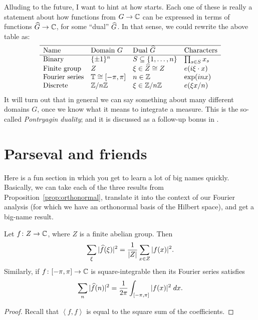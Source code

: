 Alluding to the future, I want to hint at how  starts.
Each one of these is really a statement
about how functions from $G \to \mathbb C$
can be expressed in terms of functions $\widehat G \to \mathbb C$,
for some ``dual'' $\widehat G$.
In that sense, we could rewrite the above table as:
\[
	\begin{array}{llll}
		\hline
		\text{Name} & \text{Domain }G & \text{Dual }\widehat G
			& \text{Characters} \\ \hline
		\text{Binary} & \{\pm1\}^n
			& S \subseteq \left\{ 1, \dots, n \right\}
			& \prod_{s \in S} x_s \\
		\text{Finite group} & Z
			& \xi \in \widehat Z \cong Z & e( i \xi \cdot x) \\
		\text{Fourier series} & \mathbb T \cong [-\pi, \pi]  & n \in \mathbb Z
			& \exp(inx) \\
		\text{Discrete} & \mathbb Z/n\mathbb Z & \xi \in \mathbb Z/n\mathbb Z
			& e(\xi x / n) \\
	\end{array}
\]
It will turn out that in general
we can say something about many different domains $G$,
once we know what it means to integrate a measure.
This is the so-called \emph{Pontryagin duality};
and it is discussed as a follow-up bonus in .

\section{Parseval and friends}
Here is a fun section in which you get to learn a lot of big names quickly.
Basically, we can take each of the three results
from Proposition~\ref{prop:orthonormal},
translate it into the context of our Fourier analysis
(for which we have an orthonormal basis of the Hilbert space),
and get a big-name result.

\begin{corollary}
	Let $f \colon Z \to \mathbb C$, where $Z$ is a finite abelian group.
	Then \[ \sum_\xi |\widehat f(\xi)|^2 = \frac{1}{|Z|} \sum_{x \in Z} |f(x)|^2. \]
	Similarly, if $f \colon [-\pi, \pi] \to \mathbb C$ is square-integrable then
	its Fourier series satisfies
	\[ \sum_n |\widehat f(n)|^2 = \frac{1}{2\pi} \int_{[-\pi, \pi]} |f(x)|^2 \; dx. \]
\end{corollary}
\begin{proof}
Recall that $\left< f,f\right>$ is equal to the
square sum of the coefficients.
\end{proof}

